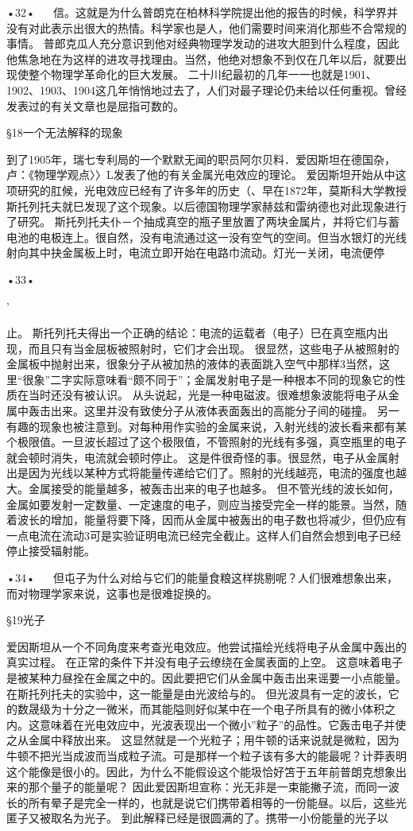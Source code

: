 •32•
  
信。这就是为什么普朗克在柏林科学院提出他的报告的时候，科学界并没有对此表示出很大的热情。科学家也是人，他们需要时间来消化那些不合常规的事情。
普郎克瓜人充分意识到他对经典物理学发动的进攻大胆到什么程度，因此他焦急地在为这样的进攻寻找理由。当然，他绝对想象不到仅在几年以后，就要出现使整个物理学革命化的巨大发展。
二十川纪最初的几年一一也就是1901、1902、1903、1904这几年悄悄地过去了，人们对最子理论仍未给以任何重视。曾经发表过的有关文章也是屈指可数的。

§18一个无法解释的现象

到了1905年，瑞七专利局的一个默默无闻的职员阿尔贝料．爱因斯坦在德国杂，卢：《物理学观点〉〉L发表了他的有关金属光电效应的理论。
爱因斯坦开始从中这项研究的肛候，光电效应已经有了许多年的历史（、早在1872年，莫斯科大学教授斯托列托夫就巳发现了这个现象。以后德国物理学家赫兹和雷纳德也对此现象进行了研究。
斯托列托夫仆－个抽成真空的瓶子里放置了两块金属片，并将它们与蓄电池的电极连上。很自然，没有电流通过这一没有空气的空间。但当水银灯的光线射向其中抉金属板上时，电流立即开始在电路巾流动。灯光一关闭，电流便停

•33•
  

'
 
止。
斯托列托夫得出一个正确的结论：电流的运载者（电子）巳在真空瓶内出现，而且只有当金屈板被照射时，它们才会出现。
很显然，这些电子从被照射的金属板中抛射出来，很象分子从被加热的液体的表面跳入空气中那样3当然，这里“很象”二字实际意味看“颇不同于”；金属发射电子是一种根本不同的现象它的性质在当时还没有被认识。
从头说起，光是一种电磁波。很难想象波能将电子从金属中轰击出来。这里并没有致使分子从液体表面轰出的高能分子间的碰撞。
另一有趣的现象也被注意到。对每种用作实验的金属来说，入射光线的波长看来都有某个极限值。一旦波长超过了这个极限值，不管照射的光线有多强，真空瓶里的电子就会顿时消失，电流就会顿时停止。
这是件很奇怪的事。很显然，电子从金属射出是因为光线以某种方式将能量传递给它们了。照射的光线越亮，电流的强度也越大。金属接受的能量越多，被轰击出来的电子也越多。
但不管光线的波长如何，金属如要发射一定数量、一定速度的电子，则应当接受完全一样的能景。当然，随着波长的增加，能量将要下降，因而从金属中被轰出的电子数也将减少，但仍应有一点电流在流动3可是实验证明电流已经完全截止。这样人们自然会想到电子已经停止接受辐射能。

•34•
  
但屯子为什么对给与它们的能量食粮这样挑剔呢？人们很难想象出来，而对物理学家来说，这事也是很难捉换的。

§19光子

爱因斯坦从一个不同角度来考查光电效应。他尝试描绘光线将电子从金属中轰出的真实过程。
在正常的条件下并没有电子云缭绕在金属表面的上空。
这意味着电子是被某种力昼拴在金属之中的。因此要把它们从金属中轰击出来谣要一小点能量。在斯托列托夫的实验中，这一能量是由光波给与的。
但光波具有一定的波长，它的数晟级为十分之一微米，而其能隘则好似某中在一个电子所具有的微小体积之内。这意味着在光电效应中，光波表现出一个微小”粒子”的品性。它轰击电子并使之从金属中释放出来。
这显然就是一个光粒子；用牛顿的话来说就是微粒，因为牛顿不把光当成波而当成粒子流。可是那样一个粒子该有多大的能最呢？计莽表明这个能像是很小的。因此，为什么不能假设这个能圾恰好笘于五年前普朗克想象出来的那个量子的能量呢？
因此爱因斯坦宣称：光无非是一束能撇子流，而同一波长的所有晕子是完全一样的，也就是说它们携带着相等的一份能昼。以后，这些光匿子又被取名为光子。
到此解释已经是很圆满的了。携带一小份能量的光子以

